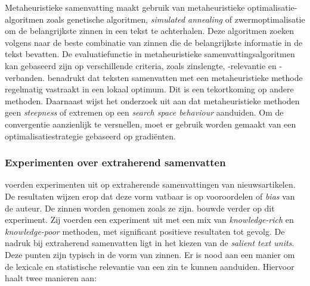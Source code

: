 Metaheuristieke samenvatting maakt gebruik van metaheuristieke optimalisatie-algoritmen zoals genetische algoritmen, \textit{simulated annealing} of zwermoptimalisatie om de belangrijkste zinnen in een tekst te achterhalen. Deze algoritmen zoeken volgens \textcite{Verma2020, Premjith2015} naar de beste combinatie van zinnen die de belangrijkste informatie in de tekst bevatten. De evaluatiefunctie in metaheuristieke samenvattingsalgoritmen kan gebaseerd zijn op verschillende criteria, zoals zinslengte, -relevantie en -verbanden. \textcite{Rani2021} benadrukt dat teksten samenvatten met een metaheuristieke methode regelmatig vastraakt in een lokaal optimum. Dit is een tekortkoming op andere methoden. Daarnaast wijst het onderzoek uit aan dat metaheuristieke methoden geen \textit{steepness} of extremen op een \textit{search space behaviour} aanduiden. Om de convergentie aanzienlijk te versnellen, moet er gebruik worden gemaakt van een optimalisatiestrategie gebaseerd op gradiënten. 


\subsubsection{Experimenten over extraherend samenvatten}


\textcite{McKeown1999} voerden experimenten uit op extraherende samenvattingen van nieuwsartikelen. De resultaten wijzen erop dat deze vorm vatbaar is op vooroordelen of \textit{bias} van de auteur. De zinnen worden genomen zoals ze zijn. \textcite{Hahn2000} bouwde verder op dit experiment. Zij voerden een experiment uit met een mix van \textit{knowledge-rich} en \textit{knowledge-poor} methoden, met significant positieve resultaten tot gevolg. De nadruk bij extraherend samenvatten ligt in het kiezen van de \textit{salient text units}. Deze punten zijn typisch in de vorm van zinnen. Er is nood aan een manier om de lexicale en statistische relevantie van een zin te kunnen aanduiden. Hiervoor haalt \textcite{Hahn2000} twee manieren aan:

